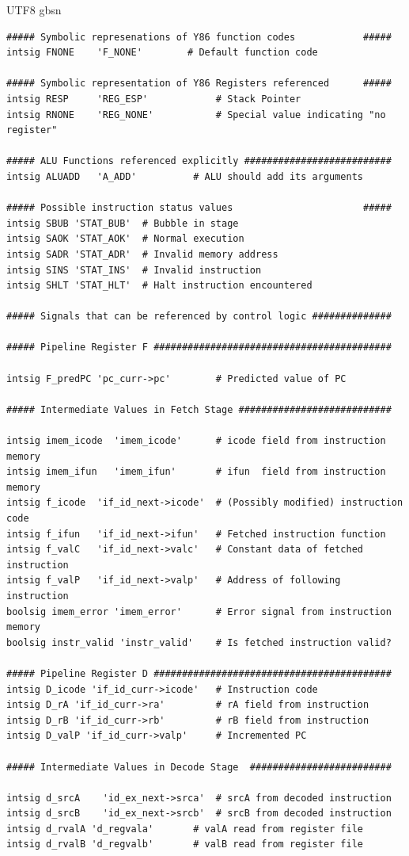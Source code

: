 \documentclass {article}
\begin{document}
\begin {CJK*} {UTF8} {gbsn}
\begin{lstlisting}
##### Symbolic represenations of Y86 function codes            #####
intsig FNONE    'F_NONE'        # Default function code

##### Symbolic representation of Y86 Registers referenced      #####
intsig RESP     'REG_ESP'    	     # Stack Pointer
intsig RNONE    'REG_NONE'   	     # Special value indicating "no register"

##### ALU Functions referenced explicitly ##########################
intsig ALUADD	'A_ADD'		     # ALU should add its arguments

##### Possible instruction status values                       #####
intsig SBUB	'STAT_BUB'	# Bubble in stage
intsig SAOK	'STAT_AOK'	# Normal execution
intsig SADR	'STAT_ADR'	# Invalid memory address
intsig SINS	'STAT_INS'	# Invalid instruction
intsig SHLT	'STAT_HLT'	# Halt instruction encountered

##### Signals that can be referenced by control logic ##############

##### Pipeline Register F ##########################################

intsig F_predPC 'pc_curr->pc'	     # Predicted value of PC

##### Intermediate Values in Fetch Stage ###########################

intsig imem_icode  'imem_icode'      # icode field from instruction memory
intsig imem_ifun   'imem_ifun'       # ifun  field from instruction memory
intsig f_icode	'if_id_next->icode'  # (Possibly modified) instruction code
intsig f_ifun	'if_id_next->ifun'   # Fetched instruction function
intsig f_valC	'if_id_next->valc'   # Constant data of fetched instruction
intsig f_valP	'if_id_next->valp'   # Address of following instruction
boolsig imem_error 'imem_error'	     # Error signal from instruction memory
boolsig instr_valid 'instr_valid'    # Is fetched instruction valid?

##### Pipeline Register D ##########################################
intsig D_icode 'if_id_curr->icode'   # Instruction code
intsig D_rA 'if_id_curr->ra'	     # rA field from instruction
intsig D_rB 'if_id_curr->rb'	     # rB field from instruction
intsig D_valP 'if_id_curr->valp'     # Incremented PC

##### Intermediate Values in Decode Stage  #########################

intsig d_srcA	 'id_ex_next->srca'  # srcA from decoded instruction
intsig d_srcB	 'id_ex_next->srcb'  # srcB from decoded instruction
intsig d_rvalA 'd_regvala'	     # valA read from register file
intsig d_rvalB 'd_regvalb'	     # valB read from register file


\end{lstlisting}
\end{CJK*}
\end{document}
